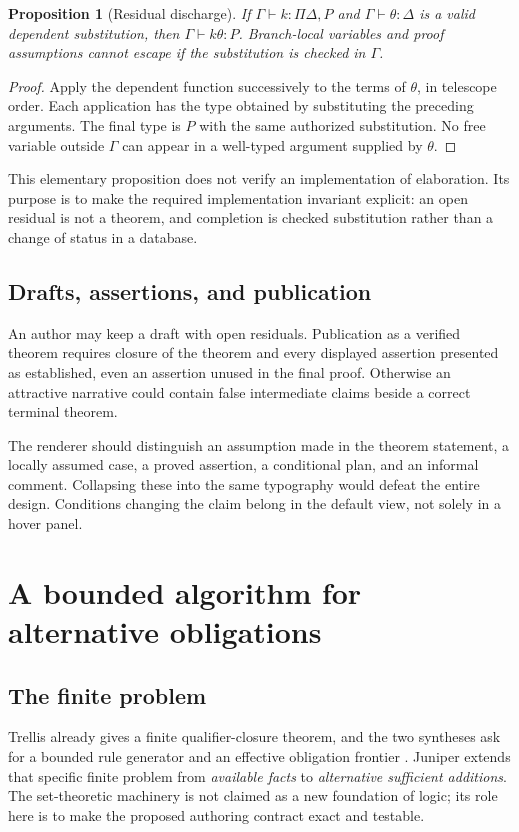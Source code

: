 \documentclass[11pt,a4paper]{article}
\newtheorem{proposition}[theorem]{Proposition}
\theoremstyle{definition}\newtheorem{definition}[theorem]{Definition}
\theoremstyle{remark}\newtheorem{remark}[theorem]{Remark}
\begin{document}
\begin{proposition}[Residual discharge]
If $\Gamma\vdash k:\Pi\Delta,P$ and $\Gamma\vdash\theta:\Delta$ is a valid dependent substitution, then $\Gamma\vdash k\theta:P$. Branch-local variables and proof assumptions cannot escape if the substitution is checked in $\Gamma$.
\end{proposition}
\begin{proof}
Apply the dependent function successively to the terms of $\theta$, in telescope order. Each application has the type obtained by substituting the preceding arguments. The final type is $P$ with the same authorized substitution. No free variable outside $\Gamma$ can appear in a well-typed argument supplied by $\theta$.
\end{proof}

This elementary proposition does not verify an implementation of elaboration. Its purpose is to make the required implementation invariant explicit: an open residual is not a theorem, and completion is checked substitution rather than a change of status in a database.

\subsection{Drafts, assertions, and publication}
An author may keep a draft with open residuals. Publication as a verified theorem requires closure of the theorem and every displayed assertion presented as established, even an assertion unused in the final proof. Otherwise an attractive narrative could contain false intermediate claims beside a correct terminal theorem.

The renderer should distinguish an assumption made in the theorem statement, a locally assumed case, a proved assertion, a conditional plan, and an informal comment. Collapsing these into the same typography would defeat the entire design. Conditions changing the claim belong in the default view, not solely in a hover panel.

\section{A bounded algorithm for alternative obligations}
\label{sec:frontier}
\subsection{The finite problem}
Trellis already gives a finite qualifier-closure theorem, and the two syntheses ask for a bounded rule generator and an effective obligation frontier \cite{trellis,synA,synB}. Juniper extends that specific finite problem from \emph{available facts} to \emph{alternative sufficient additions}. The set-theoretic machinery is not claimed as a new foundation of logic; its role here is to make the proposed authoring contract exact and testable.
\end{document}
